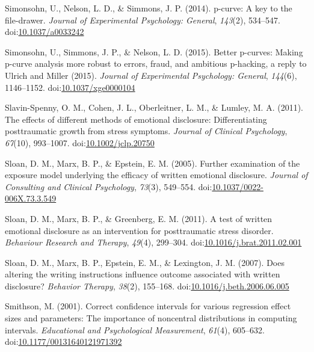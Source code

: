 \documentclass[english,man]{apa6}
\theoremstyle{definition}
\theoremstyle{definition}
\theoremstyle{definition}
\theoremstyle{remark}
\begin{document}
\hypertarget{ref-Simonsohn2014}{}
Simonsohn, U., Nelson, L. D., \& Simmons, J. P. (2014). p-curve: A key
to the file-drawer. \emph{Journal of Experimental Psychology: General},
\emph{143}(2), 534--547.
doi:\href{https://doi.org/10.1037/a0033242}{10.1037/a0033242}

\hypertarget{ref-Simonsohn2015}{}
Simonsohn, U., Simmons, J. P., \& Nelson, L. D. (2015). Better p-curves:
Making p-curve analysis more robust to errors, fraud, and ambitious
p-hacking, a reply to Ulrich and Miller (2015). \emph{Journal of
Experimental Psychology: General}, \emph{144}(6), 1146--1152.
doi:\href{https://doi.org/10.1037/xge0000104}{10.1037/xge0000104}

\hypertarget{ref-Slavin-Spenny2011}{}
Slavin-Spenny, O. M., Cohen, J. L., Oberleitner, L. M., \& Lumley, M. A.
(2011). The effects of different methods of emotional disclosure:
Differentiating posttraumatic growth from stress symptoms. \emph{Journal
of Clinical Psychology}, \emph{67}(10), 993--1007.
doi:\href{https://doi.org/10.1002/jclp.20750}{10.1002/jclp.20750}

\hypertarget{ref-Sloan2005}{}
Sloan, D. M., Marx, B. P., \& Epstein, E. M. (2005). Further examination
of the exposure model underlying the efficacy of written emotional
disclosure. \emph{Journal of Consulting and Clinical Psychology},
\emph{73}(3), 549--554.
doi:\href{https://doi.org/10.1037/0022-006X.73.3.549}{10.1037/0022-006X.73.3.549}

\hypertarget{ref-Sloan2011a}{}
Sloan, D. M., Marx, B. P., \& Greenberg, E. M. (2011). A test of written
emotional disclosure as an intervention for posttraumatic stress
disorder. \emph{Behaviour Research and Therapy}, \emph{49}(4), 299--304.
doi:\href{https://doi.org/10.1016/j.brat.2011.02.001}{10.1016/j.brat.2011.02.001}

\hypertarget{ref-Sloan2007}{}
Sloan, D. M., Marx, B. P., Epstein, E. M., \& Lexington, J. M. (2007).
Does altering the writing instructions influence outcome associated with
written disclosure? \emph{Behavior Therapy}, \emph{38}(2), 155--168.
doi:\href{https://doi.org/10.1016/j.beth.2006.06.005}{10.1016/j.beth.2006.06.005}

\hypertarget{ref-Smithson2001}{}
Smithson, M. (2001). Correct confidence intervals for various regression
effect sizes and parameters: The importance of noncentral distributions
in computing intervals. \emph{Educational and Psychological
Measurement}, \emph{61}(4), 605--632.
doi:\href{https://doi.org/10.1177/00131640121971392}{10.1177/00131640121971392}
\end{document}
